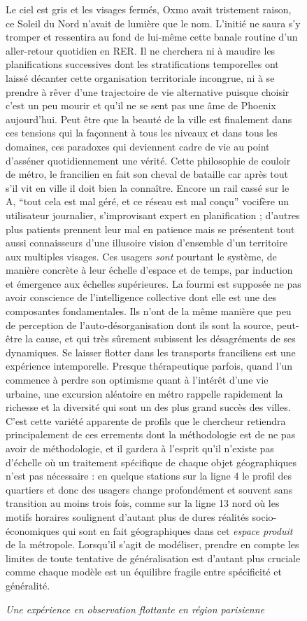 \begin{figure}[h!]
\begin{mdframed}
Le ciel est gris et les visages fermés, Oxmo avait tristement raison, ce Soleil du Nord n'avait de lumière que le nom. L'initié ne saura s'y tromper et ressentira au fond de lui-même cette banale routine d'un aller-retour quotidien en RER. Il ne cherchera ni à maudire les planifications successives dont les stratifications temporelles ont laissé décanter cette organisation territoriale incongrue, ni à se prendre à rêver d'une trajectoire de vie alternative puisque choisir c'est un peu mourir et qu'il ne se sent pas une âme de Phoenix aujourd'hui. Peut être que la beauté de la ville est finalement dans ces tensions qui la façonnent à tous les niveaux et dans tous les domaines, ces paradoxes qui deviennent cadre de vie au point d'asséner quotidiennement une vérité. Cette philosophie de couloir de métro, le francilien en fait son cheval de bataille car après tout s'il vit en ville il doit bien la connaître. Encore un rail cassé sur le A, ``tout cela est mal géré, et ce réseau est mal conçu'' vocifère un utilisateur journalier, s'improvisant expert en planification ; d'autres plus patients prennent leur mal en patience mais se présentent tout aussi connaisseurs d'une illusoire vision d'ensemble d'un territoire aux multiples visages. Ces usagers \emph{sont} pourtant le système, de manière concrète à leur échelle d'espace et de temps, par induction et émergence aux échelles supérieures. La fourmi est supposée ne pas avoir conscience de l'intelligence collective dont elle est une des composantes fondamentales. Ils n'ont de la même manière que peu de perception de l'auto-désorganisation dont ils sont la source, peut-être la cause, et qui très sûrement subissent les désagréments de ses dynamiques. Se laisser flotter dans les transports franciliens est une expérience intemporelle. Presque thérapeutique parfois, quand l'un commence à perdre son optimisme quant à l'intérêt d'une vie urbaine, une excursion aléatoire en métro rappelle rapidement la richesse et la diversité qui sont un des plus grand succès des villes. C'est cette variété apparente de profils que le chercheur retiendra principalement de ces errements dont la méthodologie est de ne pas avoir de méthodologie, et il gardera à l'esprit qu'il n'existe pas d'échelle où un traitement spécifique de chaque objet géographiques n'est pas nécessaire : en quelque stations sur la ligne 4 le profil des quartiers et donc des usagers change profondément et souvent sans transition au moins trois fois, comme sur la ligne 13 nord où les motifs horaires soulignent d'autant plus de dures réalités socio-économiques qui sont en fait géographiques dans cet \emph{espace produit} de la métropole. Lorsqu'il s'agit de modéliser, prendre en compte les limites de toute tentative de généralisation est d'autant plus cruciale comme chaque modèle est un équilibre fragile entre spécificité et généralité.

\medskip

 \textit{Une expérience en observation flottante en région parisienne}
\end{mdframed}
\end{figure}




